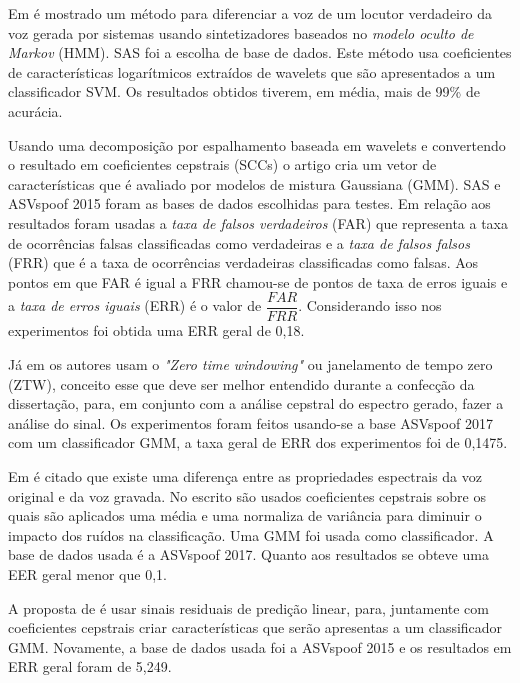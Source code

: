 \documentclass[a4paper,12pt,openright,oneside]{book}
\newenvironment{myenv}[1]
  {\begin{spacing}{#1}}
  {\end{spacing}}
\begin{document}
\begin{myenv}{1.5}
			\par Em \cite{DiqunYan2019} é mostrado um método para diferenciar a voz de um locutor verdadeiro da voz gerada por sistemas usando sintetizadores baseados no \textit{modelo oculto de Markov} (HMM). SAS\cite{SAS2019} foi a escolha de base de dados. Este método usa coeficientes de características logarítmicos extraídos de wavelets que são apresentados a um classificador SVM. Os resultados obtidos tiverem, em média, mais de 99\% de acurácia.
			
			\par Usando uma decomposição por espalhamento baseada em wavelets e convertendo o resultado em coeficientes cepstrais (SCCs) o artigo \cite{7802552} cria um vetor de características que é avaliado por modelos de mistura Gaussiana (GMM). SAS e ASVspoof 2015 \cite{ASVspoof2015} foram as bases de dados escolhidas para testes. Em relação aos resultados foram usadas a \textit{taxa de falsos verdadeiros} (FAR) que representa a taxa de ocorrências falsas classificadas como verdadeiras e a \textit{taxa de falsos falsos} (FRR) que é a taxa de ocorrências verdadeiras classificadas como falsas. Aos pontos em que FAR é igual a FRR chamou-se de pontos de taxa de erros iguais e a \textit{taxa de erros iguais} (ERR) é o valor de $\dfrac{FAR}{FRR}$. Considerando isso nos experimentos foi obtida uma ERR geral de 0,18.

			\par Já em \cite{alluri2019replay} os autores usam o \textit{"Zero time windowing"} ou janelamento de tempo zero (ZTW), conceito esse que deve ser melhor entendido durante a confecção da dissertação, para, em conjunto com a análise cepstral do espectro gerado, fazer a análise do sinal. Os experimentos foram feitos usando-se a base ASVspoof 2017\cite{ASVspoof2017} com um classificador GMM, a taxa geral de ERR dos experimentos foi de 0,1475.
			
			\par Em \cite{8725688} é citado que existe uma diferença entre as propriedades espectrais da voz original e da voz gravada. No escrito são usados coeficientes cepstrais sobre os quais são aplicados uma média e uma normaliza de variância para diminuir o impacto dos ruídos na classificação. Uma GMM foi usada como classificador. A base de dados usada é a ASVspoof 2017. Quanto aos resultados se obteve uma EER geral menor que 0,1.
		
			\par A proposta de \cite{Hanilci2018} é usar sinais residuais de predição linear, para, juntamente com coeficientes cepstrais criar características que serão apresentas a um classificador GMM. Novamente, a base de dados usada foi a ASVspoof 2015 e os resultados em ERR geral foram de 5,249.


\end{myenv}
\end{document}
